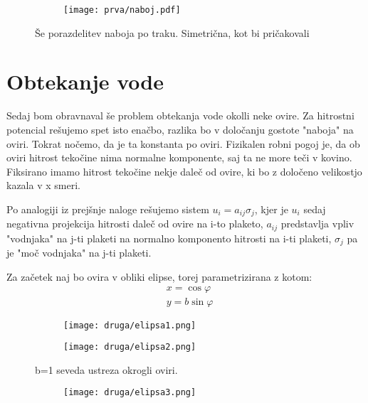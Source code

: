 \documentclass{article}
\begin{document}
\begin{figure}[H]
\centering
\begin{subfigure}{\textwidth}
\texttt{[image: prva/naboj.pdf]}
\end{subfigure}
\caption*{Še porazdelitev naboja po traku. Simetrična, kot bi pričakovali}
\end{figure}


\section{Obtekanje vode}

Sedaj bom obravnaval še problem obtekanja vode okolli neke ovire. Za hitrostni potencial rešujemo spet isto enačbo, razlika bo v določanju gostote "naboja" na oviri. Tokrat nočemo, da je ta konstanta po oviri. Fizikalen robni pogoj je, da ob oviri hitrost tekočine nima normalne komponente, saj ta ne more teči v kovino. Fiksirano imamo hitrost tekočine nekje daleč od ovire, ki bo z določeno velikostjo kazala v x smeri. 

Po analogiji iz prejšnje naloge rešujemo sistem $u_i = a_{ij} \sigma_j$, kjer je $u_i$ sedaj negativna projekcija hitrosti daleč od ovire na i-to plaketo, $a_{ij}$ predstavlja vpliv "vodnjaka" na j-ti plaketi na normalno komponento hitrosti na i-ti plaketi, $\sigma_j$ pa je "moč vodnjaka" na j-ti plaketi. 


Za začetek naj bo ovira v obliki elipse, torej parametrizirana z kotom:
\begin{align*}
&x = \cos \varphi \\
&y = b \sin \varphi
\end{align*}

\begin{figure}[H]
\centering
\begin{subfigure}{.6\textwidth}
\texttt{[image: druga/elipsa1.png]}
\end{subfigure}
\caption*{}
\end{figure}

\begin{figure}[H]
\centering
\begin{subfigure}{.6\textwidth}
\texttt{[image: druga/elipsa2.png]}
\end{subfigure}
\caption*{b=1 seveda ustreza okrogli oviri.}
\end{figure}

\begin{figure}[H]
\centering
\begin{subfigure}{.6\textwidth}
\texttt{[image: druga/elipsa3.png]}
\end{subfigure}
\caption*{}
\end{figure}
\end{document}
